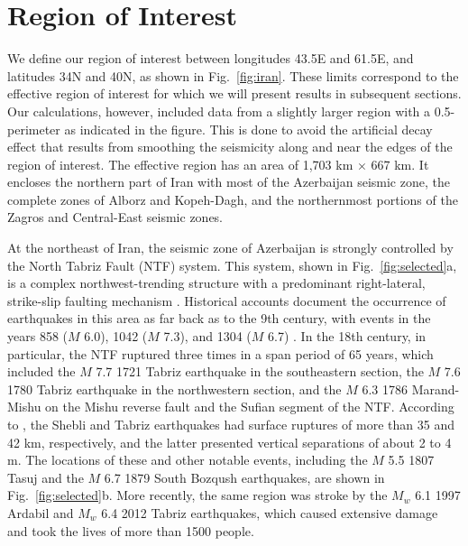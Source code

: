 \section{Region of Interest}

We define our region of interest between longitudes 43.5\textdegree{}E and 61.5\textdegree{}E, and latitudes 34\textdegree{}N and 40\textdegree{}N, as shown in Fig.~\ref{fig:iran}. These limits correspond to the effective region of interest for which we will present results in subsequent sections. Our calculations, however, included data from a slightly larger region with a 0.5\textdegree{}-perimeter as indicated in the figure. This is done to avoid the artificial decay effect that results from smoothing the seismicity along and near the edges of the region of interest. The effective region has an area of 1,703 km $\times$ 667 km. It encloses the northern part of Iran with most of the Azerbaijan seismic zone, the complete zones of Alborz and Kopeh-Dagh, and the northernmost portions of the Zagros and Central-East seismic zones.

At the northeast of Iran, the seismic zone of Azerbaijan is strongly controlled by the North Tabriz Fault (NTF) system. This system, shown in Fig.~\ref{fig:selected}a, is a complex northwest-trending structure with a predominant right-lateral, strike-slip faulting mechanism \citep{Berberian1999}. Historical accounts document the occurrence of earthquakes in this area as far back as to the 9th century, with events in the years 858 ($M$ 6.0), 1042 ($M$ 7.3), and 1304 ($M$ 6.7) \citep{Berberian1999}. In the 18th century, in particular, the NTF ruptured three times in a span period of 65 years, which included the $M$ 7.7 1721 Tabriz earthquake in the southeastern section, the $M$ 7.6 1780 Tabriz earthquake in the northwestern section, and the $M$ 6.3 1786 Marand-Mishu on the Mishu reverse fault and the Sufian segment of the NTF. According to \citet{Jones1834}, the Shebli and Tabriz earthquakes had surface ruptures of more than 35 and 42 km, respectively, and the latter presented vertical separations of about 2 to 4 m. The locations of these and other notable events, including the $M$ 5.5 1807 Tasuj and the $M$ 6.7 1879 South Bozqush earthquakes, are shown in Fig.~\ref{fig:selected}b. More recently, the same region was stroke by the $M_w$ 6.1 1997 Ardabil and $M_w$ 6.4 2012 Tabriz earthquakes, which caused extensive damage and took the lives of more than 1500 people.

